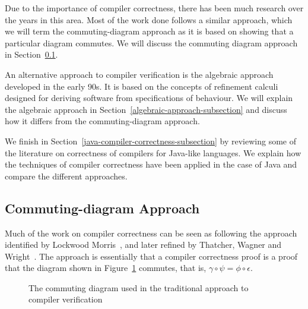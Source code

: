 \documentclass[a4paper,10pt]{report}
\begin{document}
Due to the importance of compiler correctness, there has been much research over
the years in this area.  Most of the work done follows a similar approach, which
we will term the commuting-diagram approach as it is based on showing that a
particular diagram commutes. We will discuss the commuting diagram approach in
Section~\ref{commuting-diagram-subsection}.

An alternative approach to compiler verification is the algebraic approach
developed in the early 90s.  It is based on the concepts of refinement calculi
designed for deriving software from specifications of behaviour. We will explain
the algebraic approach in Section~\ref{algebraic-approach-subsection} and
discuss how it differs from the commuting-diagram approach.

We finish in Section~\ref{java-compiler-correctness-subsection} by reviewing
some of the literature on correctness of compilers for Java-like languages. We
explain how the techniques of compiler correctness have been applied in the case
of Java and compare the different approaches.

\subsection{Commuting-diagram Approach}
\label{commuting-diagram-subsection}

Much of the work on compiler correctness can be seen as following the approach
identified by Lockwood Morris~\cite{morris1973}, and later refined by Thatcher,
Wagner and Wright~\cite{thatcher1979}. The approach is essentially that a
compiler correctness proof is a proof that the diagram shown in
Figure~\ref{commuting-diagram} commutes, that is, $\gamma \circ \psi = \phi
\circ \epsilon$.

\begin{figure}[ht]
  \begin{center}
  \end{center}
  \caption{The commuting diagram used in the traditional approach to compiler verification}
  \label{commuting-diagram}
\end{figure}
\end{document}
